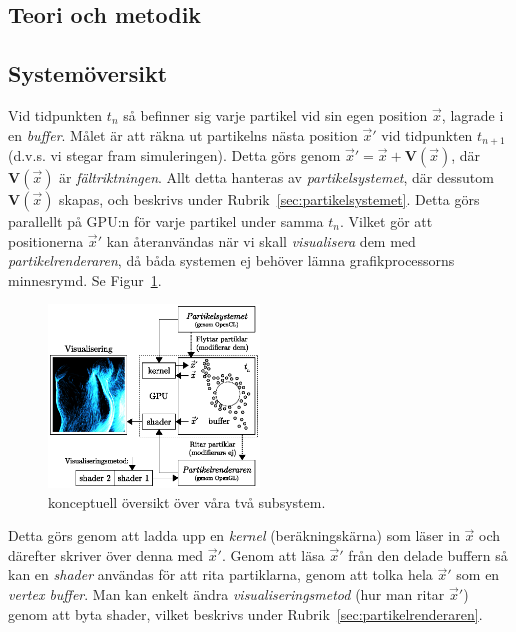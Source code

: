 \documentclass[a4paper]{article}
\begin{document}
\begin{multicols}{2}
    \vspace{-0.4cm}
    \section{Teori och metodik}
    \subsection{Systemöversikt}

    Vid tidpunkten \(t_n\) så befinner sig varje partikel vid sin egen position \(\vec{x}\), lagrade i en \emph{buffer}. Målet är att räkna ut partikelns nästa position \(\vec{x}'\) vid tidpunkten \(t_{n+1}\) (d.v.s. vi stegar fram simuleringen). Detta görs genom \(\vec{x}' = \vec{x} + \mathbf{V}(\vec{x})\), där \(\mathbf{V}(\vec{x})\) är \emph{fältriktningen}. Allt detta hanteras av \emph{partikelsystemet}, där dessutom \(\mathbf{V}(\vec{x})\) skapas, och beskrivs under Rubrik~\ref{sec:partikelsystemet}. Detta görs parallellt på GPU:n för varje partikel under samma \(t_n\). Vilket gör att positionerna \(\vec{x}'\) kan återanvändas när vi skall \emph{visualisera} dem med \emph{partikelrenderaren}, då båda systemen ej behöver lämna grafikprocessorns minnesrymd. Se Figur~\ref{fig:system}.

    \begin{figure}[H]
    \center
    \includegraphics[width=0.5\textwidth]{share/System.eps}
    \caption{konceptuell översikt över våra två subsystem.}
    \label{fig:system}
    \end{figure}

    Detta görs genom att ladda upp en \emph{kernel} (beräkningskärna) som läser in \(\vec{x}\) och därefter skriver över denna med \(\vec{x}'\). Genom att läsa \(\vec{x}'\) från den delade buffern så kan en \emph{shader} användas för att rita partiklarna, genom att tolka hela \(\vec{x}'\) som en \emph{vertex buffer}. Man kan enkelt ändra \emph{visualiseringsmetod} (hur man ritar \(\vec{x}'\)) genom att byta shader, vilket beskrivs under Rubrik~\ref{sec:partikelrenderaren}.


\end{multicols}
\end{document}
